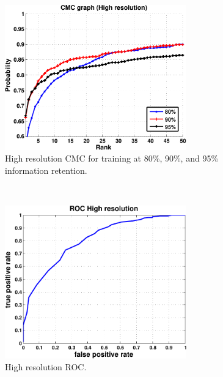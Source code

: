 ~\vfill

\vfill

~\vfill

\begin{figure}[hbt]
  \centering
  \includegraphics[width=0.7\textwidth]{../results/Output_H.pdf}
  \caption{High resolution CMC for training at 80\%, 90\%, and 95\% information retention.}
  \label{fig:cmc_h}
\end{figure}

~\vfill

\begin{figure}[hbt]
  \centering
  \includegraphics[width=0.7\textwidth]{../results/ROC_H.pdf}
  \caption{High resolution ROC.}
  \label{fig:roc_h}
\end{figure}

~\vfill

\vfill

~\vfill

